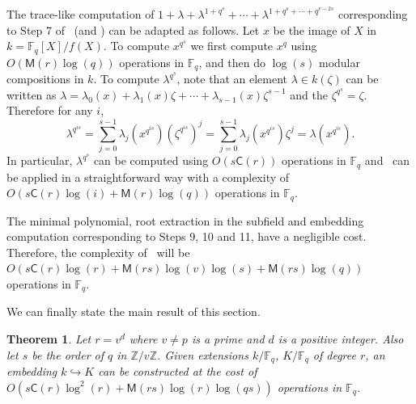 \documentclass[12pt]{article}
\theoremstyle{plain}
\newtheorem{theorem}{Theorem}
\theoremstyle{definition}
\def\Z{\ensuremath{\mathbb{Z}}}
\def\F{\ensuremath{\mathbb{F}}}
\def\MM{\ensuremath{\mathsf{M}}}
\def\CC{\ensuremath{\mathsf{C}}}
\begin{document}
The trace-like computation of
$1 + \lambda + \lambda^{1+q^{s}} + \cdots + \lambda^{1+q^{s}+\cdots+q^{v-2s}}$
corresponding to Step 7 of~\cite[Algorithm~3]{doliskanischost2011}
(and \cite[Algorithm~2]{doliskanischost2011}) can be adapted as follows.
Let $x$ be the image of $X$ in $k=\F_q[X]/f(X)$.
To compute $x^{q^s}$ we first compute $x^q$ using $O(\MM(r)\log(q))$
operations in $\F_q$, and then do $\log(s)$ modular compositions in  $k$.
To compute $\lambda^{q^s}$,
note that an element $\lambda \in k(\zeta)$ can be written as
$\lambda = \lambda_0(x) + \lambda_1(x) \zeta + \cdots + \lambda_{s - 1}(x) \zeta^{s - 1}$
and the $\zeta^{q^s} = \zeta$.
Therefore for any $i$,
\[
\lambda^{q^{i s}} = \sum_{j = 0}^{s - 1} \lambda_j(x^{q^{i s}}) \left(\zeta^{q^{i s}}\right)^j = \sum_{j = 0}^{s - 1} \lambda_j(x^{q^{i s}}) \zeta^j = \lambda\left(x^{q^{i s}}\right).
\]
In particular, $\lambda^{q^s}$ can be computed using $O(s\CC(r))$ operations in $\F_q$
and~\cite[Algorithm~2]{doliskanischost2011} can be applied in a straightforward
way with a complexity of $O(s\CC(r)\log(i) + \MM(r)\log(q))$ operations in $\F_q$.

The minimal polynomial, root extraction in the subfield and embedding computation corresponding to Steps 9, 10 and 11, have a negligible cost.
Therefore, the complexity of~\cite[Algorithm~3]{doliskanischost2011} will be
$O(s\CC(r)\log(r) + \MM(rs)\log(v)\log(s) + \MM(rs)\log(q))$
operations in $\F_q$.


We can finally state the main result of this section.
\begin{theorem}
	\label{theorem:isom-root}
	Let $r = v^d$ where $v \ne p$ is a prime and $d$ is a positive integer. Also let $s$ be the 
	order of $q$ in $\Z / v\Z$. Given extensions $k/\F_q$, $K/\F_q$ of degree $r$, an
        embedding $k\hookrightarrow K$ can be constructed at the cost of 
	$O(s\CC(r)\log^2(r) + \MM(rs)\log(r)\log(qs))$ operations in $\F_q$.
\end{theorem}
\end{document}
